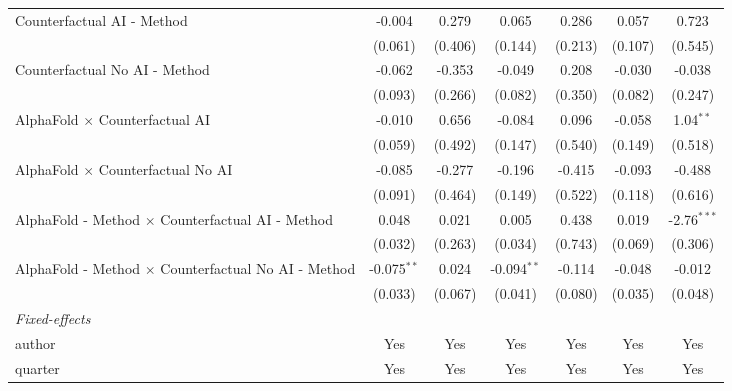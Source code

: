 \begin{tabular}{lcccccc}
   Counterfactual AI - Method                                 & -0.004        & 0.279   & 0.065         & 0.286       & 0.057         & 0.723\\   
                                                              & (0.061)       & (0.406) & (0.144)       & (0.213)     & (0.107)       & (0.545)\\   
   Counterfactual No AI - Method                              & -0.062        & -0.353  & -0.049        & 0.208       & -0.030        & -0.038\\   
                                                              & (0.093)       & (0.266) & (0.082)       & (0.350)     & (0.082)       & (0.247)\\   
   AlphaFold $\times$ Counterfactual AI                       & -0.010        & 0.656   & -0.084        & 0.096       & -0.058        & 1.04$^{**}$\\   
                                                              & (0.059)       & (0.492) & (0.147)       & (0.540)     & (0.149)       & (0.518)\\   
   AlphaFold $\times$ Counterfactual No AI                    & -0.085        & -0.277  & -0.196        & -0.415      & -0.093        & -0.488\\   
                                                              & (0.091)       & (0.464) & (0.149)       & (0.522)     & (0.118)       & (0.616)\\   
   AlphaFold - Method $\times$ Counterfactual AI - Method     & 0.048         & 0.021   & 0.005         & 0.438       & 0.019         & -2.76$^{***}$\\   
                                                              & (0.032)       & (0.263) & (0.034)       & (0.743)     & (0.069)       & (0.306)\\   
   AlphaFold - Method $\times$ Counterfactual No AI - Method  & -0.075$^{**}$ & 0.024   & -0.094$^{**}$ & -0.114      & -0.048        & -0.012\\   
                                                              & (0.033)       & (0.067) & (0.041)       & (0.080)     & (0.035)       & (0.048)\\   
   \midrule
   \emph{Fixed-effects}\\
   author                                                     & Yes           & Yes     & Yes           & Yes         & Yes           & Yes\\  
   quarter                                                    & Yes           & Yes     & Yes           & Yes         & Yes           & Yes\\  

\end{tabular}

